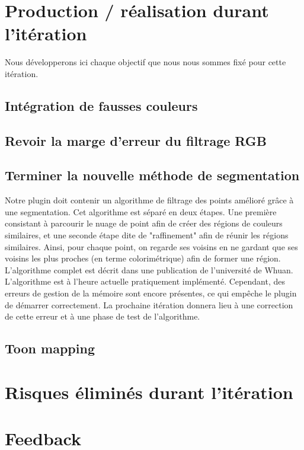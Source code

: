 \documentclass[12pt,titlepage,french]{article}
\begin{document}
\section{Production / réalisation durant l'itération}

Nous développerons ici chaque objectif que nous nous sommes fixé pour cette itération.

\subsection{Intégration de fausses couleurs}

\subsection{Revoir la marge d'erreur du filtrage RGB}

\subsection{Terminer la nouvelle méthode de segmentation}

Notre plugin doit contenir un algorithme de filtrage des points amélioré grâce à une segmentation. Cet algorithme est séparé en deux étapes. Une première consistant à parcourir le nuage de point afin de créer des régions de couleurs similaires, et une seconde étape dite de "raffinement" afin de réunir les régions similaires. \newline
Ainsi, pour chaque point, on regarde ses voisins en ne gardant que ses voisins les plus proches (en terme colorimétrique) afin de former une région. L'algorithme complet est décrit dans une publication de l'université de \cite{B01} Whuan. 
L'algorithme est à l'heure actuelle pratiquement implémenté. Cependant, des erreurs de gestion de la mémoire sont encore présentes, ce qui empêche le plugin de démarrer correctement. La prochaine itération donnera lieu à une correction de cette erreur et à une phase de test de l'algorithme.
\subsection{Toon mapping}

\section{Risques éliminés durant l'itération}


\section{Feedback}
\end{document}
